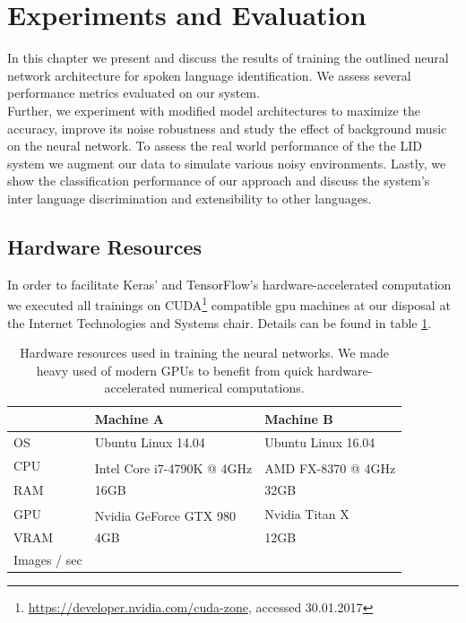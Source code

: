 \section{Experiments and Evaluation} 
\label{sec:evaluation}
In this chapter we present and discuss the results of training the outlined neural network architecture for spoken language identification. We assess several performance metrics evaluated on our system.\\
Further, we experiment with modified model architectures to maximize the accuracy, improve its noise robustness and study the effect of background music on the neural network. To assess the real world performance of the the LID system we augment our data to simulate various noisy environments. Lastly, we show the classification performance of our approach and discuss the system's inter language discrimination and extensibility to other languages.     

\subsection{Hardware Resources}
\label{sec:hardware}
	In order to facilitate Keras' and TensorFlow's hardware-accelerated computation we executed all trainings on CUDA\footnote{\url{https://developer.nvidia.com/cuda-zone}, accessed 30.01.2017} compatible \ac{gpu} machines at our disposal at the Internet Technologies and Systems chair. Details can be found in table \ref{tab:hardware}.
		
	\begin{table}[h]
	\centering
	\begin{tabularx}{\textwidth}{lll}
	\toprule
	  		& Machine A 					& Machine B \\ \midrule
	OS  	& Ubuntu Linux 14.04 		& Ubuntu Linux 16.04 \\
	CPU  	& Intel\textsuperscript{\textregistered} Core\textsuperscript{\texttrademark} i7-4790K @ 4GHz 	& AMD FX\textsuperscript{\texttrademark}-8370  @ 4GHz \\
	RAM  	& 16GB 						& 32GB \\
	GPU  	& Nvidia GeForce\textsuperscript{\textregistered} GTX 980 	& Nvidia Titan X \\
	VRAM  	& 4GB 						& 12GB \\
	Images / sec &				& \\
	\bottomrule
	\end{tabularx}
	\caption{Hardware resources used in training the neural networks. We made heavy used of modern GPUs to benefit from quick hardware-accelerated numerical computations.}
	\label{tab:hardware}
	\end{table}

